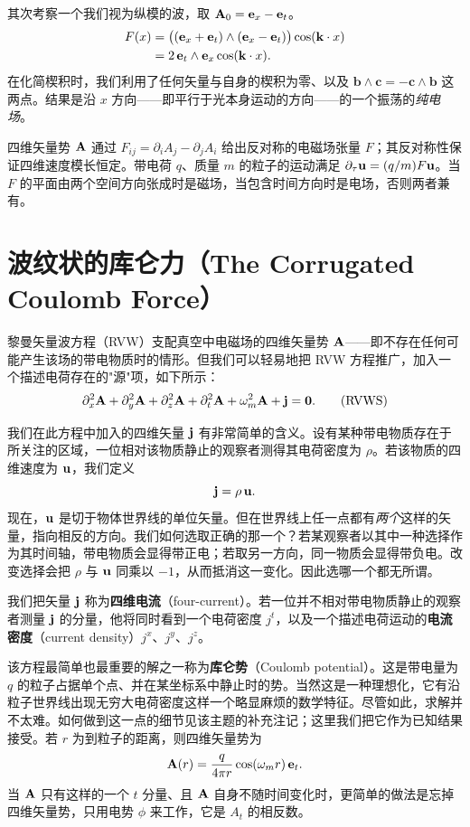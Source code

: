 其次考察一个我们视为纵模的波，取 $\mathbf{A}_0 = \mathbf{e}_x - \mathbf{e}_t$。
\[
\begin{aligned}
F(x) &= \big((\mathbf{e}_x + \mathbf{e}_t)\wedge(\mathbf{e}_x - \mathbf{e}_t)\big)\cos(\mathbf{k}\cdot x) \\
     &= 2\,\mathbf{e}_t \wedge \mathbf{e}_x \cos(\mathbf{k}\cdot x).
\end{aligned}
\]
在化简楔积时，我们利用了任何矢量与自身的楔积为零、以及 $\mathbf{b}\wedge\mathbf{c} = -\mathbf{c}\wedge\mathbf{b}$ 这两点。结果是沿 $x$ 方向——即平行于光本身运动的方向——的一个振荡的\emph{纯电场}。

\begin{keybox}[黎曼电磁场的要点]
四维矢量势 $\mathbf{A}$ 通过 $F_{ij} = \partial_i A_j - \partial_j A_i$ 给出反对称的电磁场张量 $F$；其反对称性保证四维速度模长恒定。带电荷 $q$、质量 $m$ 的粒子的运动满足 $\partial_\tau \mathbf{u} = (q/m)F\mathbf{u}$。当 $F$ 的平面由两个空间方向张成时是磁场，当包含时间方向时是电场，否则两者兼有。
\end{keybox}

\section{波纹状的库仑力（The Corrugated Coulomb Force）}

黎曼矢量波方程（RVW）支配真空中电磁场的四维矢量势 $\mathbf{A}$——即不存在任何可能产生该场的带电物质时的情形。但我们可以轻易地把 RVW 方程推广，加入一个描述电荷存在的"源"项，如下所示：
\begin{equation}
\partial_x^{2}\mathbf{A} + \partial_y^{2}\mathbf{A} + \partial_z^{2}\mathbf{A} + \partial_t^{2}\mathbf{A} + \omega_m^{2} \mathbf{A} + \mathbf{j} = \mathbf{0}. \tag{RVWS}
\end{equation}

我们在此方程中加入的四维矢量 $\mathbf{j}$ 有非常简单的含义。设有某种带电物质存在于所关注的区域，一位相对该物质静止的观察者测得其电荷密度为 $\rho$。若该物质的四维速度为 $\mathbf{u}$，我们定义
\[
\mathbf{j} = \rho\,\mathbf{u}.
\]
现在，$\mathbf{u}$ 是切于物体世界线的单位矢量。但在世界线上任一点都有\emph{两个}这样的矢量，指向相反的方向。我们如何选取正确的那一个？若某观察者以其中一种选择作为其时间轴，带电物质会显得带正电；若取另一方向，同一物质会显得带负电。改变选择会把 $\rho$ 与 $\mathbf{u}$ 同乘以 $-1$，从而抵消这一变化。因此选哪一个都无所谓。

我们把矢量 $\mathbf{j}$ 称为\textbf{四维电流}（four-current）。若一位并不相对带电物质静止的观察者测量 $\mathbf{j}$ 的分量，他将同时看到一个电荷密度 $j^t$，以及一个描述电荷运动的\textbf{电流密度}（current density）$j^x$、$j^y$、$j^z$。

该方程最简单也最重要的解之一称为\textbf{库仑势}（Coulomb potential）。这是带电量为 $q$ 的粒子占据单个点、并在某坐标系中静止时的势。当然这是一种理想化，它有沿粒子世界线出现无穷大电荷密度这样一个略显麻烦的数学特征。尽管如此，求解并不太难。如何做到这一点的细节见该主题的补充注记；这里我们把它作为已知结果接受。若 $r$ 为到粒子的距离，则四维矢量势为
\[
\mathbf{A}(r) = \frac{q}{4\pi r}\cos(\omega_m r)\,\mathbf{e}_t.
\]
当 $\mathbf{A}$ 只有这样的一个 $t$ 分量、且 $\mathbf{A}$ 自身不随时间变化时，更简单的做法是忘掉四维矢量势，只用电势 $\phi$ 来工作，它是 $A_t$ 的相反数。


